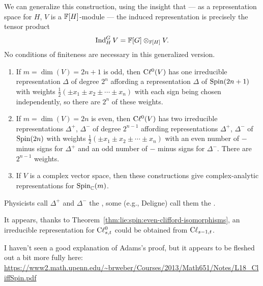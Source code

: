 We can generalize this construction, using the insight that --- as a
representation space for $H$, $V$ is a $\mathbb{F}[H]$-module --- the induced
representation is precisely the tensor product
\begin{equation}
\operatorname{Ind}_H^GV = \mathbb{F}[G]\otimes_{\mathbb{F}[H]}V.
\end{equation}
No conditions of finiteness are necessary in this generalized version.

\begin{proposition}
\begin{enumerate}
\item If $m=\dim(V)=2n+1$ is odd, then $\mathrm{C}\ell^{0}(V)$ has one irreducible
  representation $\Delta$ of degree $2^{n}$ affording a representation
  $\Delta$ of $\operatorname{Spin}(2n+1)$ with weights $\frac{1}{2}(\pm x_{1}\pm x_{2}\pm\cdots\pm x_{n})$
  with each sign being chosen independently, so there are $2^{n}$ of
  these weights.
\item If $m=\dim(V)=2n$ is even, then $\mathrm{C}\ell^{0}(V)$ has two irreducible
  representations $\Delta^{+}$, $\Delta^{-}$ of degree $2^{n-1}$
  affording representations $\Delta^{+}$, $\Delta^{-}$ of $\operatorname{Spin}(2n)$
  with weights $\frac{1}{2}(\pm x_{1}\pm x_{2}\pm\cdots\pm x_{n})$
  with an even number of $-$ minus signs for $\Delta^{+}$ and an odd number of
  $-$ minus signs for $\Delta^{-}$. There are $2^{n-1}$ weights.
\item If $V$ is a complex vector space, then these constructions give
  complex-analytic representations for $\operatorname{Spin}_{\mathbb{C}}(m)$.
\end{enumerate}
\end{proposition}

Physicists call $\Delta^{+}$ and $\Delta^{-}$ the ,
some (e.g., Deligne) call them the .

\begin{remark}
It appears, thanks to Theorem~\ref{thm:lie:spin:even-clifford-isomorphisms},
an irreducible representation for $\mathrm{C}\ell_{s,t}^{0}$ could be obtained from
$\mathrm{C}\ell_{s-1,t}$. 
\end{remark}

\begin{remark}
I haven't seen a good explanation of Adams's proof, but it appears to be
fleshed out a bit more fully here: \url{https://www2.math.upenn.edu/~brweber/Courses/2013/Math651/Notes/L18_CliffSpin.pdf}
\end{remark}

